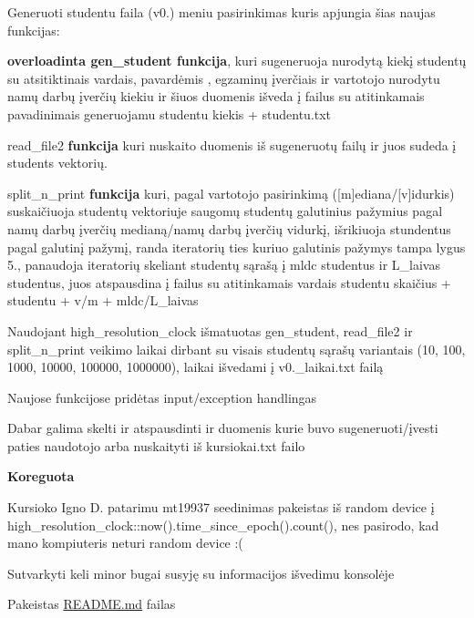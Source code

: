 \begin{DoxyItemize}
\item {\ttfamily Generuoti studentu faila (v0.)} meniu pasirinkimas kuris apjungia šias naujas funkcijas\+:
\item {\bfseries{overload\textquotesingle{}inta {\ttfamily gen\+\_\+student} funkcija}}, kuri sugeneruoja nurodytą kiekį studentų su atsitiktinais vardais, pavardėmis , egzaminų įverčiais ir vartotojo nurodytu namų darbų įverčių kiekiu ir šiuos duomenis išveda į failus su atitinkamais pavadinimais {\ttfamily generuojamu studentu kiekis + studentu.\+txt}
\item {\ttfamily read\+\_\+file2} {\bfseries{funkcija}} kuri nuskaito duomenis iš sugeneruotų failų ir juos sudeda į students vektorių.
\item {\ttfamily split\+\_\+n\+\_\+print} {\bfseries{funkcija}} kuri, pagal vartotojo pasirinkimą (\mbox{[}m\mbox{]}ediana/\mbox{[}v\mbox{]}idurkis) suskaičiuoja studentų vektoriuje saugomų studentų galutinius pažymius pagal namų darbų įverčių medianą/namų darbų įverčių vidurkį, išrikiuoja stundentus pagal galutinį pažymį, randa iteratorių ties kuriuo galutinis pažymys tampa lygus 5., panaudoja iteratorių skeliant studentų sąrašą į {\ttfamily mldc} studentus ir {\ttfamily L\+\_\+laivas} studentus, juos atspausdina į failus su atitinkamais vardais {\ttfamily studentu skaičius + studentu + v/m + mldc/\+L\+\_\+laivas}
\item Naudojant {\ttfamily high\+\_\+resolution\+\_\+clock} išmatuotas {\ttfamily gen\+\_\+student}, {\ttfamily read\+\_\+file2} ir {\ttfamily split\+\_\+n\+\_\+print} veikimo laikai dirbant su visais studentų sąrašų variantais (10, 100, 1000, 10000, 100000, 1000000), laikai išvedami į {\ttfamily v0.\+\_\+laikai.\+txt} failą
\item Naujose funkcijose pridėtas input/exception handling\textquotesingle{}as
\item Dabar galima skelti ir atspausdinti ir duomenis kurie buvo sugeneruoti/įvesti paties naudotojo arba nuskaityti iš kursiokai.\+txt failo
\end{DoxyItemize}

{\bfseries{Koreguota}}


\begin{DoxyItemize}
\item Kursioko Igno D. patarimu mt19937 seedinimas pakeistas iš random device į {\ttfamily high\+\_\+resolution\+\_\+clock\+::now().time\+\_\+since\+\_\+epoch().count()}, nes pasirodo, kad mano kompiuteris neturi random device \+:(
\item Sutvarkyti keli minor bug\textquotesingle{}ai susyję su informacijos išvedimu konsolėje
\item Pakeistas \mbox{\hyperlink{_r_e_a_d_m_e_8md}{R\+E\+A\+D\+M\+E.\+md}} failas
\end{DoxyItemize}

